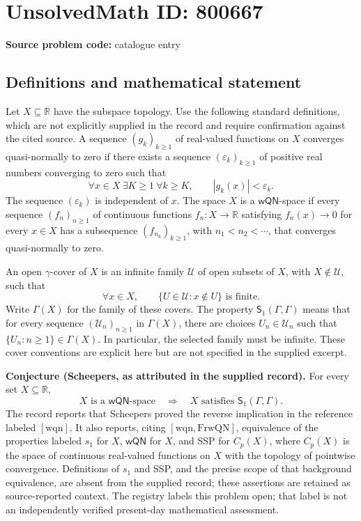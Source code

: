 \documentclass[11pt]{article}
\newcommand{\R}{\mathbb{R}}
\begin{document}
\section*{UnsolvedMath ID: 800667}
\textbf{Source problem code:} catalogue entry
\subsection{Definitions and mathematical statement}
Let \(X\subseteq\R\) have the subspace topology. Use the following standard definitions, which are not explicitly supplied in the record and require confirmation against the cited source. A sequence \((g_k)_{k\geq1}\) of real-valued functions on \(X\) converges quasi-normally to zero if there exists a sequence \((\varepsilon_k)_{k\geq1}\) of positive real numbers converging to zero such that
\[
\forall x\in X\ \exists K\geq1\ \forall k\geq K,\qquad |g_k(x)|<\varepsilon_k.
\]
The sequence \((\varepsilon_k)\) is independent of \(x\). The space \(X\) is a \(\mathsf{wQN}\)-space if every sequence \((f_n)_{n\geq1}\) of continuous functions \(f_n:X\to\R\) satisfying \(f_n(x)\to0\) for every \(x\in X\) has a subsequence \((f_{n_k})_{k\geq1}\), with \(n_1<n_2<\cdots\), that converges quasi-normally to zero.

An open \(\gamma\)-cover of \(X\) is an infinite family \(\mathcal U\) of open subsets of \(X\), with \(X\notin\mathcal U\), such that
\[
\forall x\in X,\qquad \{U\in\mathcal U:x\notin U\}\text{ is finite}.
\]
Write \(\Gamma(X)\) for the family of these covers. The property \(\mathsf S_1(\Gamma,\Gamma)\) means that for every sequence \((\mathcal U_n)_{n\geq1}\) in \(\Gamma(X)\), there are choices \(U_n\in\mathcal U_n\) such that \(\{U_n:n\geq1\}\in\Gamma(X)\). In particular, the selected family must be infinite. These cover conventions are explicit here but are not specified in the supplied excerpt.

\textbf{Conjecture (Scheepers, as attributed in the supplied record).} For every set \(X\subseteq\R\),
\[
X\text{ is a }\mathsf{wQN}\text{-space}
\quad\Longrightarrow\quad
X\text{ satisfies }\mathsf S_1(\Gamma,\Gamma).
\]
The record reports that Scheepers proved the reverse implication in the reference labeled \([\mathrm{wqn}]\). It also reports, citing \([\mathrm{wqn},\mathrm{FrwQN}]\), equivalence of the properties labeled \(s_1\) for \(X\), \(\mathsf{wQN}\) for \(X\), and SSP for \(C_p(X)\), where \(C_p(X)\) is the space of continuous real-valued functions on \(X\) with the topology of pointwise convergence. Definitions of \(s_1\) and SSP, and the precise scope of that background equivalence, are absent from the supplied record; these assertions are retained as source-reported context. The registry labels this problem open; that label is not an independently verified present-day mathematical assessment.
\end{document}

